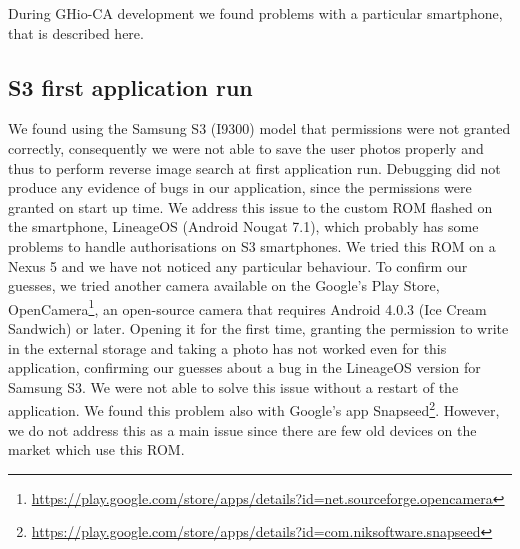 During GHio-CA development we found problems with a particular smartphone, that 
is described here.

\subsection{S3 first application run}

We found using the Samsung S3 (I9300) model that permissions were not granted 
correctly, consequently we were not able to save the user photos properly and 
thus to perform reverse image search at first application run. Debugging did not 
produce any evidence of bugs in our application, since the permissions were 
granted on start up time.
We address this issue to the custom ROM flashed on the smartphone, LineageOS 
(Android Nougat 7.1), which probably has some problems to handle authorisations 
on S3 smartphones. We tried this ROM on a Nexus 5 and we have not noticed any 
particular behaviour.
To confirm our guesses, we tried another camera available on the Google's Play 
Store, 
OpenCamera\footnote{\url{
https://play.google.com/store/apps/details?id=net.sourceforge.opencamera}}, an 
open-source camera that requires Android 4.0.3 (Ice Cream Sandwich) or later.
Opening it for the first time, granting the permission to write in the external 
storage and taking a photo has not worked even for this application, confirming 
our guesses about a bug in the LineageOS version for Samsung S3.
We were not able to solve this issue without a restart of the application. We 
found this problem also with Google's app 
Snapseed\footnote{\url{
https://play.google.com/store/apps/details?id=com.niksoftware.snapseed}}.
However, we do not address this as a main issue since there are few old devices 
on the market which use this ROM.
